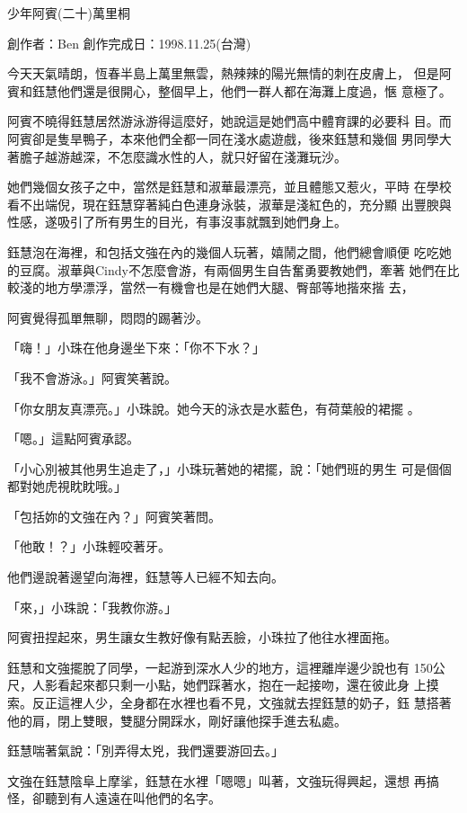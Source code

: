 



少年阿賓(二十)萬里桐

創作者：Ben
創作完成日：1998.11.25(台灣)


今天天氣晴朗，恆春半島上萬里無雲，熱辣辣的陽光無情的刺在皮膚上，
但是阿賓和鈺慧他們還是很開心，整個早上，他們一群人都在海灘上度過，愜
意極了。

阿賓不曉得鈺慧居然游泳游得這麼好，她說這是她們高中體育課的必要科
目。而阿賓卻是隻旱鴨子，本來他們全都一同在淺水處遊戲，後來鈺慧和幾個
男同學大著膽子越游越深，不怎麼識水性的人，就只好留在淺灘玩沙。

她們幾個女孩子之中，當然是鈺慧和淑華最漂亮，並且體態又惹火，平時
在學校看不出端倪，現在鈺慧穿著純白色連身泳裝，淑華是淺紅色的，充分顯
出豐腴與性感，遂吸引了所有男生的目光，有事沒事就飄到她們身上。

鈺慧泡在海裡，和包括文強在內的幾個人玩著，嬉鬧之間，他們總會順便
吃吃她的豆腐。淑華與Cindy不怎麼會游，有兩個男生自告奮勇要教她們，牽著
她們在比較淺的地方學漂浮，當然一有機會也是在她們大腿、臀部等地揩來揩
去，

阿賓覺得孤單無聊，悶悶的踢著沙。

「嗨！」小珠在他身邊坐下來：「你不下水？」

「我不會游泳。」阿賓笑著說。

「你女朋友真漂亮。」小珠說。她今天的泳衣是水藍色，有荷葉般的裙擺
。

「嗯。」這點阿賓承認。

「小心別被其他男生追走了，」小珠玩著她的裙擺，說：「她們班的男生
可是個個都對她虎視眈眈哦。」

「包括妳的文強在內？」阿賓笑著問。

「他敢！？」小珠輕咬著牙。

他們邊說著邊望向海裡，鈺慧等人已經不知去向。

「來，」小珠說：「我教你游。」

阿賓扭捏起來，男生讓女生教好像有點丟臉，小珠拉了他往水裡面拖。

鈺慧和文強擺脫了同學，一起游到深水人少的地方，這裡離岸邊少說也有
150公尺，人影看起來都只剩一小點，她們踩著水，抱在一起接吻，還在彼此身
上摸索。反正這裡人少，全身都在水裡也看不見，文強就去捏鈺慧的奶子，鈺
慧搭著他的肩，閉上雙眼，雙腿分開踩水，剛好讓他探手進去私處。

鈺慧喘著氣說：「別弄得太兇，我們還要游回去。」

文強在鈺慧陰阜上摩挲，鈺慧在水裡「嗯嗯」叫著，文強玩得興起，還想
再搞怪，卻聽到有人遠遠在叫他們的名字。

